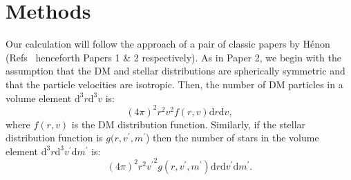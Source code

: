 \documentclass[aps,floatfix,prd,showpacs]{revtex4}
\newcommand{\diff}{\mathrm{d}}
\newcommand{\vp}{v^\prime}
\newcommand{\mpr}{m^\prime}
\begin{document}
\section{Methods}
\label{section:methods}


Our calculation will follow the approach of a pair of classic papers by H\'{e}non (Refs~\cite{HenonA,HenonB} henceforth Papers 1 \& 2 respectively).  As in Paper 2, we begin with the assumption that the DM and stellar distributions are spherically symmetric and that the particle velocities are isotropic.  Then, the number of DM particles in a volume element $\diff^3r\diff^3v$ is:
%
\begin{equation}
(4\pi)^2r^2v^2f(r,v)\diff r\diff v,
\end{equation}
%
%
where $f(r,v)$ is the DM distribution function.  Similarly, if the stellar distribution function is $g(r,\vp,\mpr$) then the number of stars in the volume element $\diff^3r\diff^3\vp \diff \mpr$ is:
%
\begin{equation}
(4\pi)^2r^2{\vp}^2g(r,\vp,\mpr)\diff r\diff \vp \diff \mpr.
\end{equation}
%
%
\end{document}
